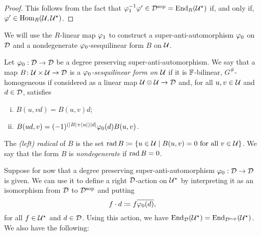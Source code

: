 \begin{proof}
    This follows from the fact that $ \varphi_1^{-1} \varphi' \in  \mathcal{D}^{\mathrm{sop}} = \operatorname{End}_R(\mathcal U^\star)$ if, and only if, $\varphi' \in \operatorname{Hom}_R(\mathcal U, \mathcal U^\star)$.
\end{proof}


We will use 
the $R$-linear map 
$\varphi_1$ to construct a super-anti-automorphism $\varphi_0$ on $\mathcal{D}$ and a nondegenerate $\varphi_0$-sesquilinear form $B$ on $\mathcal U$. 

\begin{defi}\label{def:sesquilinear-form}
    Let $\varphi_0: \mathcal{D} \to \mathcal{D}$ be a degree preserving su\-per\--an\-ti\--auto\-mor\-phism. We say that a map $B\colon \mathcal U \times \mathcal U \to \mathcal{D}$ is a \emph{$\varphi_0$-sesquilinear form on $\mathcal U$} if it is $\mathbb{F}$-bilinear, $G^\#$-homogeneous if considered as a linear map $\mathcal U\otimes \mathcal U \to \mathcal{D}$ and, for all $u,v \in \mathcal U$ and $d\in \mathcal{D}$, satisfies
    \begin{enumerate}[(i)]
        \item $B(u,vd) = B(u,v)d$; \label{enum:linear-on-the-second}
        \item $B(ud, v) = (-1)^ {(|B| + |u|)|d|}\varphi_0(d) B(u, v)$. \label{enum:vphi0-linear-on-the-first}
    \end{enumerate}
    
    The \emph{(left) radical} of $B$ is the set $\operatorname{rad} B \coloneqq \{u\in \mathcal U \mid B(u, v) = 0 \text{ for all } v\in \mathcal U\}$. We say that the form $B$ is \emph{nondegenerate} if $\operatorname{rad} B = 0$.
\end{defi}

Suppose for now that a degree preserving su\-per\--an\-ti\--auto\-mor\-phism $\varphi_0: \mathcal{D} \to \mathcal{D}$ is given. 
We can use it to define a right $\mathcal{D}$-action on $\mathcal U^\star$ by interpreting it as an isomorphism from $\mathcal{D}$ to $\mathcal{D}^{\mathrm{sop}}$ and putting 
%
\begin{equation}\label{eq:right-D-action}
    f\cdot d \coloneqq f \overline{\varphi_0(d)},
\end{equation}
%
for all $f \in \mathcal U^\star$ and $d\in \mathcal{D}$. 
Using this action, we have $\operatorname{End}_{\mathcal{D}} (\mathcal U^\star) = \operatorname{End}_{\mathcal{D}^{\mathrm{sop}}} (\mathcal U^\star)$. We also have the following:

